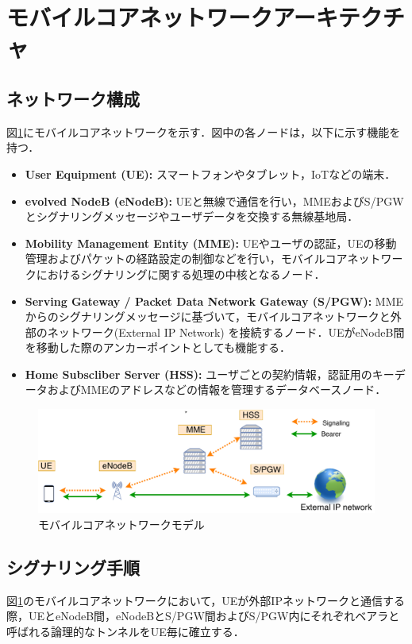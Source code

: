 \documentclass[technicalreport]{ieicej-rev}
\begin{document}
\section{モバイルコアネットワークアーキテクチャ}
\label{sec:モバイルコアネットワークアーキテクチャ}
  \subsection{ネットワーク構成}
    図\ref{networkmodel}にモバイルコアネットワークを示す．図中の各ノードは，以下に示す機能を持つ．
    \begin{itemize}
      \item \textbf{User Equipment (UE):} スマートフォンやタブレット，IoTなどの端末．
      \item \textbf{evolved NodeB (eNodeB):} UEと無線で通信を行い，MMEおよびS/PGWとシグナリングメッセージやユーザデータを交換する無線基地局．
      \item \textbf{Mobility Management Entity (MME):} UEやユーザの認証，UEの移動管理およびパケットの経路設定の制御などを行い，モバイルコアネットワークにおけるシグナリングに関する処理の中核となるノード．
      \item \textbf{Serving Gateway / Packet Data Network Gateway (S/PGW):} MMEからのシグナリングメッセージに基づいて，モバイルコアネットワークと外部のネットワーク(External IP Network) を接続するノード．UEがeNodeB間を移動した際のアンカーポイントとしても機能する．
      \item \textbf{Home Subscliber Server (HSS):} ユーザごとの契約情報，認証用のキーデータおよびMMEのアドレスなどの情報を管理するデータベースノード．
    \end{itemize}
    \begin{figure}[!t]
      \centering
      \includegraphics[width=1\hsize]{networkmodel.pdf}
      \caption{モバイルコアネットワークモデル}
      \label{networkmodel}
    \end{figure}


  \subsection{シグナリング手順}
  \label{sec:signaling}
  図\ref{networkmodel}のモバイルコアネットワークにおいて，UEが外部IPネットワークと通信する際，UEとeNodeB間，eNodeBとS/PGW間およびS/PGW内にそれぞれベアラと呼ばれる論理的なトンネルをUE毎に確立する．
\end{document}
